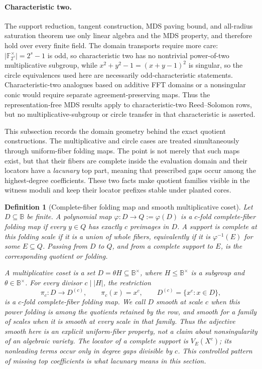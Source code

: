 \documentclass[11pt,a4paper]{amsart}
\numberwithin{equation}{section}
\newtheorem{definition}[definition]{Definition}
\theoremstyle{remark}
\newcommand{\F}{\mathbb F}
\newcommand{\B}{\mathbb B}
\newcommand{\abs}[1]{\lvert #1\rvert}
\begin{document}
\paragraph{Characteristic two.}
The support reduction, tangent construction, MDS paving bound, and
all-radius saturation theorem use only linear algebra and the MDS property,
and therefore hold over every finite field.  The domain transports require
more care: \(\abs{\F_{2^s}^{\times}}=2^s-1\) is odd, so characteristic two
has no nontrivial power-of-two multiplicative subgroup, while
\(x^2+y^2-1=(x+y-1)^2\) is singular, so the circle equivalences used here
are necessarily odd-characteristic statements.  Characteristic-two analogues
based on additive FFT domains or a nonsingular conic would require separate
agreement-preserving maps.  Thus the representation-free MDS results apply
to characteristic-two Reed--Solomon rows, but no multiplicative-subgroup or
circle transfer in that characteristic is asserted.

This subsection records the domain geometry behind the exact quotient
constructions.  The multiplicative and circle cases are treated simultaneously through
uniform-fiber folding maps.  The point is not merely that such maps exist,
but that their fibers are complete inside the evaluation domain and their
locators have a \emph{lacunary} top part, meaning that prescribed gaps occur
among the highest-degree coefficients.  These two facts make quotient
families visible in the witness moduli and keep their locator prefixes
stable under planted cores.

\begin{definition}[Complete-fiber folding map and smooth multiplicative coset]
\label{def:structured-folding}
Let \(D\subseteq\B\) be finite.  A polynomial map
\(\varphi:D\to Q:=\varphi(D)\) is a \emph{\(c\)-fold
complete-fiber folding map} if every \(y\in Q\) has exactly \(c\)
preimages in \(D\).  A support is \emph{complete at this folding scale}
if it is a union of whole fibers, equivalently if it is
\(\varphi^{-1}(E)\) for some \(E\subseteq Q\).  Passing from \(D\) to
\(Q\), and from a complete support to \(E\), is the corresponding
\emph{quotient} or \emph{folding}.

A \emph{multiplicative coset} is a set \(D=\theta H\subseteq\B^\times\),
where \(H\le\B^\times\) is a subgroup and \(\theta\in\B^\times\).
For every divisor \(c\mid\abs H\), the restriction
\[
             \pi_c:D\longrightarrow D^{(c)},\qquad
             \pi_c(x)=x^c,\qquad
             D^{(c)}=\{x^c:x\in D\},
\]
is a \(c\)-fold complete-fiber folding map.  We call \(D\)
\emph{smooth at scale \(c\)} when this power folding is among the
quotients retained by the row, and \emph{smooth} for a family of scales
when it is smooth at every scale in that family.  Thus the adjective
\emph{smooth} here is an explicit uniform-fiber property, not a claim
about nonsingularity of an algebraic variety.  The locator of a complete
support is \(V_E(X^c)\); its nonleading terms occur only in degree gaps
divisible by \(c\).  This controlled pattern of missing top coefficients
is what \emph{lacunary} means in this section.
\end{definition}
\end{document}

